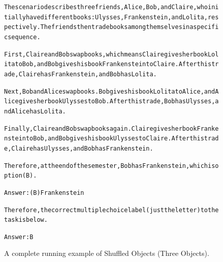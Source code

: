 \begin{figure}[t]
{{\begin{alltt}
The scenario describes three friends, Alice, Bob, and Claire, who initially have different books: Ulysses, Frankenstein, and Lolita, respectively. The friends then trade books among themselves in a specific sequence.

First, Claire and Bob swap books, which means Claire gives her book Lolita to Bob, and Bob gives his book Frankenstein to Claire. After this trade, Claire has Frankenstein, and Bob has Lolita.

Next, Bob and Alice swap books. Bob gives his book Lolita to Alice, and Alice gives her book Ulysses to Bob. After this trade, Bob has Ulysses, and Alice has Lolita.

Finally, Claire and Bob swap books again. Claire gives her book Frankenstein to Bob, and Bob gives his book Ulysses to Claire. After this trade, Claire has Ulysses, and Bob has Frankenstein.

Therefore, at the end of the semester, Bob has Frankenstein, which is option (B).

Answer: (B) Frankenstein

Therefore, the correct multiple choice label (just the letter) to the task is below.

Answer: B
\end{alltt}
}}
\caption{A complete running example of Shuffled Objects (Three Objects).}
\label{fig:shuffled_objects=three_objects_example}
\end{figure}
